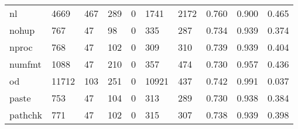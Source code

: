 \begin{longtable}{lp{2.0cm}p{2.0cm}p{2.0cm}p{2.0cm}p{2.0cm}p{2.0cm}p{2.0cm}p{2.0cm}p{2.0cm}}
nl        &                   4669 &                                467 &                               289 &                                0 &                              1741 &                            2172 &                                0.760 &                                  0.900 &                                0.465 \\
nohup     &                    767 &                                 47 &                                98 &                                0 &                               335 &                             287 &                                0.734 &                                  0.939 &                                0.374 \\
nproc     &                    768 &                                 47 &                               102 &                                0 &                               309 &                             310 &                                0.739 &                                  0.939 &                                0.404 \\
numfmt    &                   1088 &                                 47 &                               210 &                                0 &                               357 &                             474 &                                0.730 &                                  0.957 &                                0.436 \\
od        &                  11712 &                                103 &                               251 &                                0 &                             10921 &                             437 &                                0.742 &                                  0.991 &                                0.037 \\
paste     &                    753 &                                 47 &                               104 &                                0 &                               313 &                             289 &                                0.730 &                                  0.938 &                                0.384 \\
pathchk   &                    771 &                                 47 &                               102 &                                0 &                               315 &                             307 &                                0.738 &                                  0.939 &                                0.398 \\

\end{longtable}
